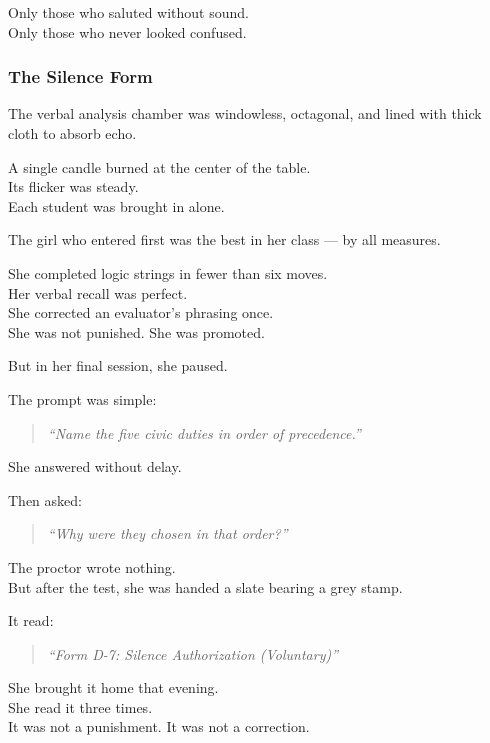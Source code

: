 \documentclass[12pt]{article}
\begin{document}
Only those who saluted without sound.\\

Only those who never looked confused.

\dotfill

\subsubsection{The Silence Form}

The verbal analysis chamber was windowless, octagonal, and lined with thick cloth to absorb echo.

A single candle burned at the center of the table.\\
Its flicker was steady.\\
Each student was brought in alone.

\vspace{1em}

The girl who entered first was the best in her class — by all measures.

She completed logic strings in fewer than six moves.\\
Her verbal recall was perfect.\\
She corrected an evaluator’s phrasing once.\\
She was not punished. She was promoted.

But in her final session, she paused.

The prompt was simple:

\begin{quote}
\textit{“Name the five civic duties in order of precedence.”}
\end{quote}

She answered without delay.

Then asked:

\begin{quote}
\textit{“Why were they chosen in that order?”}
\end{quote}

The proctor wrote nothing.\\
But after the test, she was handed a slate bearing a grey stamp.

It read:

\begin{quote}
\textit{“Form D-7: Silence Authorization (Voluntary)”}
\end{quote}

\vspace{1em}

She brought it home that evening.\\
She read it three times.\\
It was not a punishment. It was not a correction.
\end{document}

